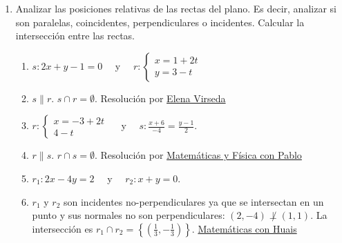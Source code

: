 \documentclass[a4paper]{article}
\newcommand{\answer}{\item[**]}
\newcommand{\exercise}{\item}
\begin{document}
\begin{enumerate}
\begin{enumerate} [label=(\alph*)]
		\item Forma un ángulo de $30^{\circ}$ con el eje de abscisas (eje $x$).
		\answer La recta NO es única. Se obtiene el vector unitario $\hat{d}=(\cos 30^{\circ}, \sin 30^{\circ})=\left(\frac{\sqrt{3}}{2},\frac{1}{2}\right)$ como director. Se puede elegir cualquier punto para definir la recta. Por ejemplo, con $P(1,3)$ y se obtiene la recta $(x,y)=(1,3)+k\left(\frac{\sqrt{3}}{2},\frac{1}{2}\right)$.

		\item Pasa por el punto $P(3,-2)$ y es normal a $\vec{n}$, donde $\vec{n}$ es un vector con ángulo $\displaystyle\frac{\pi}{4}$ con respecto al eje de ordenadas.
		\answer $\vec{n}$ puede ser $\overrightarrow{n_1}=(\cos 45^{\circ}, \sin 45^{\circ})=\left(\frac{\sqrt{2}}{2},\frac{\sqrt{2}}{2}\right)$ o $\overrightarrow{n_2}=(\cos 135^{\circ}, \sin 135^{\circ})=\left(-\frac{\sqrt{2}}{2},\frac{\sqrt{2}}{2}\right)$. Por lo que la recta no es única. Las opciones son: $(x,y)=(3,-2)+k\left(\frac{\sqrt{2}}{2},\frac{\sqrt{2}}{2}\right)$ o $(x,y)=(3,-2)+t\left(-\frac{\sqrt{2}}{2},\frac{\sqrt{2}}{2}\right)$.

	\end{enumerate}

	\exercise Analizar las posiciones relativas de las rectas del plano. Es decir, analizar si son paralelas, coincidentes, perpendiculares o incidentes. Calcular la intersección entre las rectas.
	\begin{enumerate} [label=(\alph*)]
		
		\item $s: 2x+y-1=0$ ~~y~~ $r:\left\{\begin{matrix}x=1+2t \\ y=3-t\end{matrix}\right.$
		\answer $s \parallel r$. $s \cap r=\emptyset$.  Resolución por \href{https://youtu.be/cHsXMw3V4mQ}{Elena Virseda}

		\item $r:\left\{\begin{matrix}x=-3+2t \\ 4-t\end{matrix}\right.$ ~~y~~ $s:\displaystyle{\frac{x+6}{-4}}=\displaystyle{\frac{y-1}{2}}$.
		\answer $r \parallel s$. $r \cap s=\emptyset$. Resolución por \href{https://youtu.be/MPUh70MKVUY}{Matemáticas y Física con Pablo}

		\item $r_1: 2x-4y=2$ ~~y~~ $r_2: x+y=0$.
		\answer $r_1$ y $r_2$ son incidentes no-perpendiculares ya que se intersectan en un punto y sus normales no son perpendiculares: $(2,-4) \not\perp (1,1)$. La intersección es $r_1 \cap r_2=\left\{ \left(\frac{1}{3},-\frac{1}{3}\right)\right\}$. \href{https://youtu.be/LgIU8pd8DeM?t=97}{Matemáticas con Huais}


\end{enumerate}
\end{enumerate}
\end{document}
